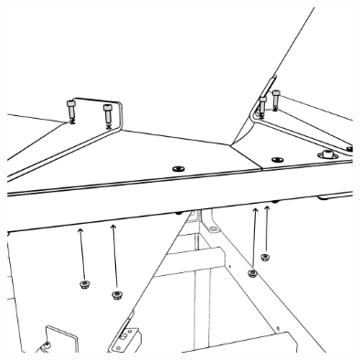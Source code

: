 \vspace{1em}

\begin{center}
    \includegraphics[height=10cm]{../images/_209_.png}
\end{center}

\vspace{0.7em}




